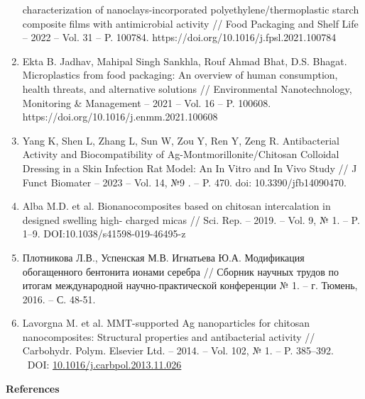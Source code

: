 \begin{references}
\begin{enumerate}
  characterization of nanoclays-incorporated polyethylene/thermoplastic
  starch composite films with antimicrobial activity // Food Packaging
  and Shelf Life -- 2022 -- Vol. 31 -- P. 100784.
  https://doi.org/10.1016/j.fpsl.2021.100784
\item
  Ekta B. Jadhav, Mahipal Singh Sankhla, Rouf Ahmad Bhat, D.S. Bhagat.
  Microplastics from food packaging: An overview of human consumption,
  health threats, and alternative solutions // Environmental
  Nanotechnology, Monitoring \& Management -- 2021 -- Vol. 16 -- P.
  100608. https://doi.org/10.1016/j.enmm.2021.100608
\item
  Yang K, Shen L, Zhang L, Sun W, Zou Y, Ren Y, Zeng R. Antibacterial
  Activity and Biocompatibility of Ag-Montmorillonite/Chitosan Colloidal
  Dressing in a Skin Infection Rat Model: An In Vitro and In Vivo Study
  // J Funct Biomater -- 2023 -- Vol. 14, №9 . -- P. 470. doi:
  10.3390/jfb14090470.
\item
  Alba M.D. et al. Bionanocomposites based on chitosan intercalation in
  designed swelling high- charged micas // Sci. Rep. -- 2019. -- Vol. 9,
  № 1. -- P. 1--9. DOI:10.1038/s41598-019-46495-z
\item
  Плотникова Л.В., Успенская М.В. Игнатьева Ю.А. Модификация
  обогащенного бентонита ионами серебра // Сборник научных трудов по
  итогам международной научно-практической конференции № 1. -- г.
  Тюмень, 2016. -- С. 48-51.
\item
  Lavorgna M. et al. MMT-supported Ag nanoparticles for chitosan
  nanocomposites: Structural properties and antibacterial activity //
  Carbohydr. Polym. Elsevier Ltd. -- 2014. -- Vol. 102, № 1. -- P.
  385--392. ~DOI:
  \href{https://doi.org/10.1016/j.carbpol.2013.11.026}{10.1016/j.carbpol.2013.11.026}
\end{enumerate}
\end{references}

\begin{center}
{\bfseries References}
\end{center}


